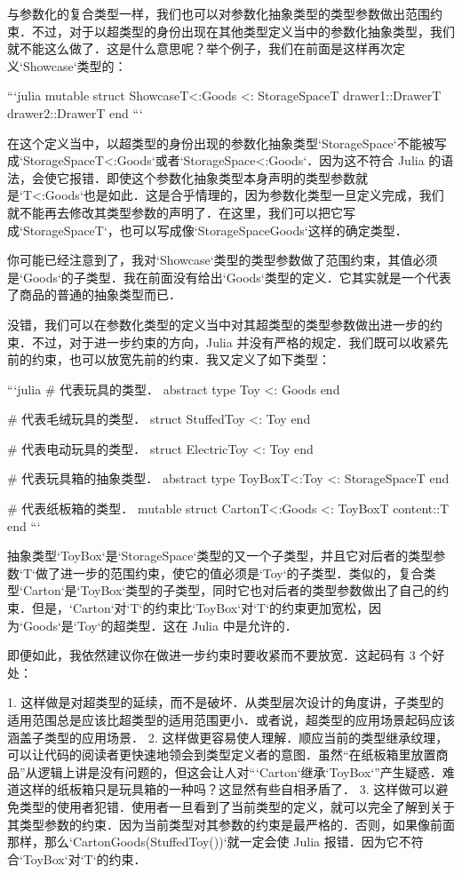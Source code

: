 与参数化的复合类型一样，我们也可以对参数化抽象类型的类型参数做出范围约束．不过，对于以超类型的身份出现在其他类型定义当中的参数化抽象类型，我们就不能这么做了．这是什么意思呢？举个例子，我们在前面是这样再次定义`Showcase`类型的：

```julia
mutable struct Showcase{T<:Goods} <: StorageSpace{T}
    drawer1::Drawer{T}
    drawer2::Drawer{T}
end
```

在这个定义当中，以超类型的身份出现的参数化抽象类型`StorageSpace`不能被写成`StorageSpace{T<:Goods}`或者`StorageSpace{<:Goods}`．因为这不符合 Julia 的语法，会使它报错．即使这个参数化抽象类型本身声明的类型参数就是`{T<:Goods}`也是如此．这是合乎情理的，因为参数化类型一旦定义完成，我们就不能再去修改其类型参数的声明了．在这里，我们可以把它写成`StorageSpace{T}`，也可以写成像`StorageSpace{Goods}`这样的确定类型．

你可能已经注意到了，我对`Showcase`类型的类型参数做了范围约束，其值必须是`Goods`的子类型．我在前面没有给出`Goods`类型的定义．它其实就是一个代表了商品的普通的抽象类型而已．

没错，我们可以在参数化类型的定义当中对其超类型的类型参数做出进一步的约束．不过，对于进一步约束的方向，Julia 并没有严格的规定．我们既可以收紧先前的约束，也可以放宽先前的约束．我又定义了如下类型：

```julia
# 代表玩具的类型．
abstract type Toy <: Goods end

# 代表毛绒玩具的类型．
struct StuffedToy <: Toy end

# 代表电动玩具的类型．
struct ElectricToy <: Toy end

# 代表玩具箱的抽象类型．
abstract type ToyBox{T<:Toy} <: StorageSpace{T} end

# 代表纸板箱的类型．
mutable struct Carton{T<:Goods} <: ToyBox{T}
    content::T
end
```

抽象类型`ToyBox`是`StorageSpace`类型的又一个子类型，并且它对后者的类型参数`T`做了进一步的范围约束，使它的值必须是`Toy`的子类型．类似的，复合类型`Carton`是`ToyBox`类型的子类型，同时它也对后者的类型参数做出了自己的约束．但是，`Carton`对`T`的约束比`ToyBox`对`T`的约束更加宽松，因为`Goods`是`Toy`的超类型．这在 Julia 中是允许的．

即便如此，我依然建议你在做进一步约束时要收紧而不要放宽．这起码有 3 个好处：

1. 这样做是对超类型的延续，而不是破坏．从类型层次设计的角度讲，子类型的适用范围总是应该比超类型的适用范围更小．或者说，超类型的应用场景起码应该涵盖子类型的应用场景．
2. 这样做更容易使人理解．顺应当前的类型继承纹理，可以让代码的阅读者更快速地领会到类型定义者的意图．虽然“在纸板箱里放置商品”从逻辑上讲是没有问题的，但这会让人对“`Carton`继承`ToyBox`”产生疑惑．难道这样的纸板箱只是玩具箱的一种吗？这显然有些自相矛盾了．
3. 这样做可以避免类型的使用者犯错．使用者一旦看到了当前类型的定义，就可以完全了解到关于其类型参数的约束．因为当前类型对其参数的约束是最严格的．否则，如果像前面那样，那么`Carton{Goods}(StuffedToy())`就一定会使 Julia 报错．因为它不符合`ToyBox`对`T`的约束．

